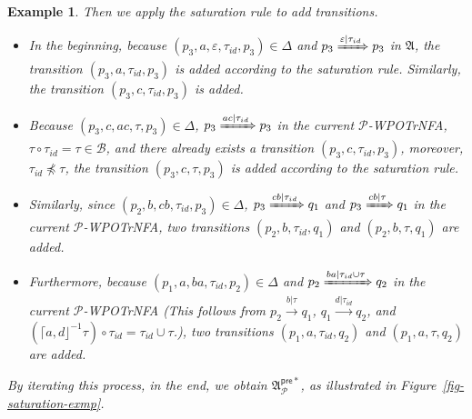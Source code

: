 \documentclass[preprint,12pt]{elsarticle}
\newtheorem{example}{Example}
\newcommand\Pp{{\mathcal{P} }}
\newcommand\pre{{\mathsf{pre} }}
\newcommand\Aut{{\mathfrak{A} }}
\newcommand\Tranbasis{{\mathscr{B} }}
\newcommand{\WOTrNFA}{\textsf{WPOTrNFA}}
\begin{document}
\begin{example}
Then we apply the saturation rule to add transitions.
\begin{itemize}
\item In the beginning, because $(p_3, a, \varepsilon, \tau_{id}, p_3) \in \Delta$ and $p_3 \xRightarrow{\varepsilon | \tau_{id}} p_3$ in $\Aut$, the transition $(p_3, a, \tau_{id}, p_3)$ is added according to the saturation rule. Similarly, the transition $(p_3, c, \tau_{id}, p_3)$ is added. 
%
\item Because $(p_3, c, ac, \tau, p_3) \in \Delta$, $p_3 \xRightarrow{ac | \tau_{id}} p_3$  in the current $\Pp$-{\WOTrNFA}, $\tau \circ \tau_{id} = \tau \in \Tranbasis$, and 
 there already exists a transition $(p_3, c, \tau_{id}, p_3)$, moreover, $\tau_{id} \not \preceq \tau$, the transition $(p_3, c, \tau, p_3)$ is added according to the saturation rule. 
%
\item Similarly, since $(p_2, b, cb, \tau_{id}, p_3) \in \Delta$, $p_3 \xRightarrow{cb | \tau_{id}} q_1$ and $p_3 \xRightarrow{cb | \tau} q_1$ in the current $\Pp$-{\WOTrNFA}, two transitions $(p_2, b, \tau_{id}, q_1)$  and $(p_2, b, \tau, q_1)$ are added. 
%
\item Furthermore, because $(p_1, a, ba, \tau_{id}, p_2) \in \Delta$ and $p_2 \xRightarrow{ba | \tau_{id} \cup \tau} q_2$ in the current $\Pp$-{\WOTrNFA} (This follows from $p_2 \xrightarrow{b | \tau} q_1$, $q_1 \xrightarrow{d | \tau_{id}} q_2$, and $(\lceil a, d\rfloor^{-1} \tau) \circ \tau_{id} = \tau_{id} \cup \tau$.), two transitions $(p_1, a, \tau_{id}, q_2)$  and $(p_1, a, \tau, q_2)$ are added.
%
\end{itemize}
By iterating this process, in the end, we obtain $\Aut^{\pre*}_{\Pp}$, as illustrated in Figure~\ref{fig-saturation-exmp}.
\begin{figure}[htb]
    \centering

\end{figure}
\end{example}
\end{document}
